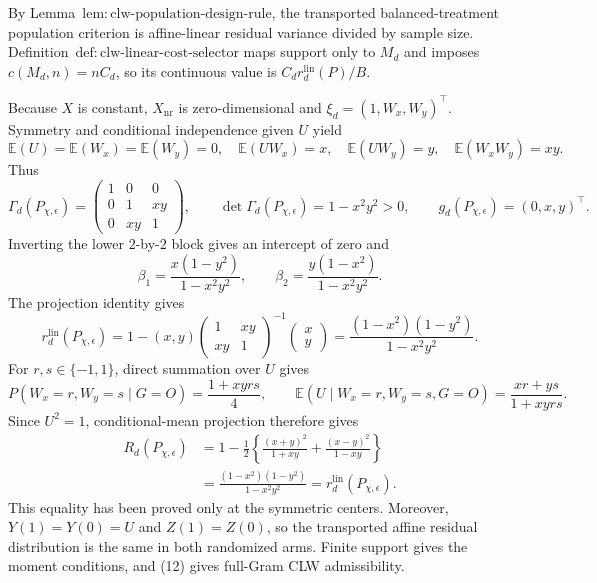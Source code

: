 By Lemma~\(\mathrm{lem{:}clw\text{-}population\text{-}design\text{-}rule}\), the transported balanced-treatment population criterion is affine-linear residual variance divided by sample size.  Definition~\(\mathrm{def{:}clw\text{-}linear\text{-}cost\text{-}selector}\) maps support only to \(M_d\) and imposes \(c(M_d,n)=nC_d\), so its continuous value is \(C_dr_d^{\mathrm{lin}}(P)/B\).

Because \(X\) is constant, \(X_{\mathrm{nr}}\) is zero-dimensional and \(\xi_d=(1,W_x,W_y)^\top\).  Symmetry and conditional independence given \(U\) yield
\[
 \mathbb E(U)=\mathbb E(W_x)=\mathbb E(W_y)=0,
 \quad \mathbb E(UW_x)=x,
 \quad \mathbb E(UW_y)=y,
 \quad \mathbb E(W_xW_y)=xy.                              \tag{11}
\]
Thus
\[
 \Gamma_d(P_{\chi,\epsilon})=
 \begin{pmatrix}1&0&0\\0&1&xy\\0&xy&1\end{pmatrix},
 \qquad
 \det\Gamma_d(P_{\chi,\epsilon})=1-x^2y^2>0,
 \qquad
 g_d(P_{\chi,\epsilon})=(0,x,y)^\top.                    \tag{12}
\]
Inverting the lower \(2\)-by-\(2\) block gives an intercept of zero and
\[
 \beta_1=\frac{x(1-y^2)}{1-x^2y^2},
 \qquad
 \beta_2=\frac{y(1-x^2)}{1-x^2y^2}.                       \tag{13}
\]
The projection identity gives
\[
 r_d^{\mathrm{lin}}(P_{\chi,\epsilon})
 =1-(x,y)
 \begin{pmatrix}1&xy\\xy&1\end{pmatrix}^{-1}
 \begin{pmatrix}x\\y\end{pmatrix}
 =\frac{(1-x^2)(1-y^2)}{1-x^2y^2}.                        \tag{14}
\]
For \(r,s\in\{-1,1\}\), direct summation over \(U\) gives
\[
 P(W_x=r,W_y=s\mid G=O)=\frac{1+xyrs}{4},
 \qquad
 \mathbb E(U\mid W_x=r,W_y=s,G=O)=\frac{xr+ys}{1+xyrs}.
\]
Since \(U^2=1\), conditional-mean projection therefore gives
\[
\begin{aligned}
 R_d(P_{\chi,\epsilon})
 &=1-\frac12\left\{
 \frac{(x+y)^2}{1+xy}+\frac{(x-y)^2}{1-xy}\right\}\\
 &=\frac{(1-x^2)(1-y^2)}{1-x^2y^2}
 =r_d^{\mathrm{lin}}(P_{\chi,\epsilon}).                 \tag{15}
\end{aligned}
\]
This equality has been proved only at the symmetric centers.  Moreover, \(Y(1)=Y(0)=U\) and \(Z(1)=Z(0)\), so the transported affine residual distribution is the same in both randomized arms.  Finite support gives the moment conditions, and (12) gives full-Gram CLW admissibility.

